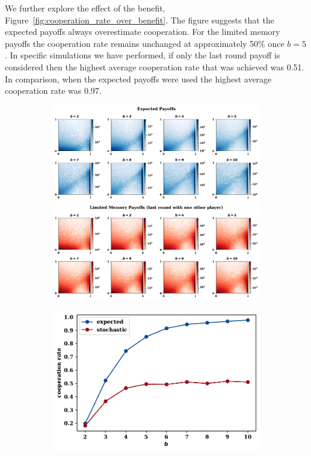 \documentclass[11pt]{article}
\theoremstyle{plainCl1}
\theoremstyle{plainCl2}
\begin{document}
We further explore the effect of the benefit,
Figure~\ref{fig:cooperation_rate_over_benefit}. The figure suggests that the
expected payoffs always overestimate cooperation. For the limited memory payoffs
the cooperation rate remains unchanged at approximately 50\% once \(b = 5\). In
specific simulations we have performed, if only the last round payoff is
considered then the highest average cooperation rate that was achieved was 0.51.
In comparison, when the expected payoffs were used the highest average
cooperation rate was 0.97.

\begin{figure}[!htbp]
  \centering
  \begin{subfigure}{.5\textwidth}
    \centering
    \includegraphics[width=\textwidth]{static/expected_for_beta.pdf}
    \includegraphics[width=\textwidth]{static/stochastic_for_beta.pdf}
  \end{subfigure}%
  \begin{subfigure}{.5\textwidth}
    \centering
    \includegraphics[width=\textwidth]{static/cooperation_rate_over_b.pdf}

\end{subfigure}
\end{figure}
\end{document}
